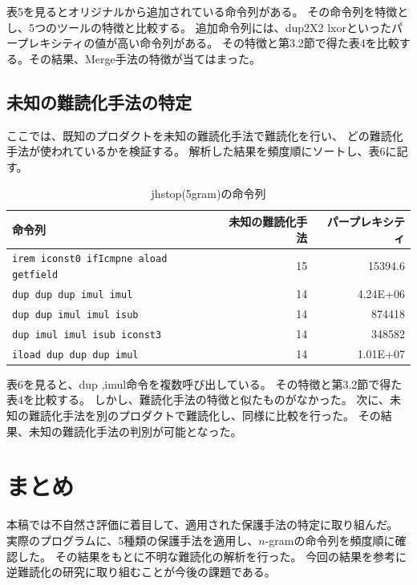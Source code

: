 \documentclass[a4j,fleqn,10pt]{jarticle}
\begin{document}
表5を見るとオリジナルから追加されている命令列がある。
その命令列を特徴とし、5つのツールの特徴と比較する。
追加命令列には、dup2X2 lxorといったパープレキシティの値が高い命令列がある。
その特徴と第3.2節で得た表4を比較する。その結果、Merge手法の特徴が当てはまった。

\subsection{未知の難読化手法の特定}
ここでは、既知のプロダクトを未知の難読化手法で難読化を行い、
どの難読化手法が使われているかを検証する。
解析した結果を頻度順にソートし、表6に記す。

\begin{table}[t]
  \centering
  \footnotesize{
    \caption{jhstop(5gram)の命令列}\label{table:jhstop}
  \begin{tabular}{lrr}
    命令列 &
    \multicolumn{1}{p{1cm}}{未知の難読化手法} & 
    \multicolumn{1}{p{1cm}}{パープレキシティ} \\ \hline
    \texttt{irem iconst0 ifIcmpne aload getfield}     & 15 & 15394.6 \\
    \texttt{dup dup dup imul imul}                    & 14 & 4.24E+06 \\
    \texttt{dup dup imul imul isub}                   & 14 & 874418 \\
    \texttt{dup imul imul isub iconst3}               & 14 & 348582 \\
    \texttt{iload dup dup dup imul}                   & 14 & 1.01E+07 \\
    \end{tabular}}
\end{table}

表6を見ると、dup ,imul命令を複数呼び出している。
その特徴と第3.2節で得た表4を比較する。
しかし、難読化手法の特徴と似たものがなかった。
 次に、未知の難読化手法を別のプロダクトで難読化し、同様に比較を行った。
 その結果、未知の難読化手法の判別が可能となった。
 
 \section{まとめ}

 本稿では不自然さ評価に着目して、適用された保護手法の特定に取り組んだ。
実際のプログラムに、5種類の保護手法を適用し、$n$-gramの命令列を頻度順に確認した。
その結果をもとに不明な難読化の解析を行った。
今回の結果を参考に逆難読化の研究に取り組むことが今後の課題である。




\end{document}
